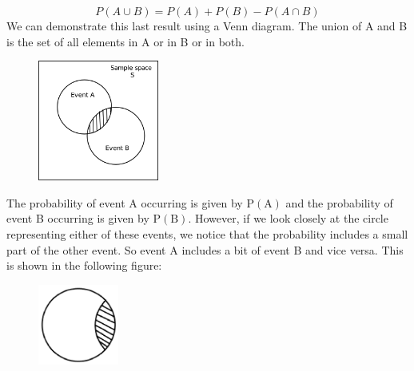     \begin{equation}
    P\left(A\cup B\right)=P\left(A\right)+P\left(B\right)-P\left(A\cap B\right)\tag{11.6}
      \end{equation}
\label{m39377*eip-41}We can demonstrate this last result using a Venn diagram. The union of A and B is the set of all elements in A or in B or in both.
    \setcounter{subfigure}{0}
	\begin{figure}[H] %
    \begin{center}
    \label{m39377*uid743!!!underscore!!!media}\label{m39377*uid743!!!underscore!!!printimage}\includegraphics[width=150px]{col11306.imgs/m39377_venn1.png} %
      \vspace{2pt}
    \vspace{.1in}
    \end{center}
 \end{figure}       
\par \label{m39377*eip-227}The probability of event A occurring is given by $\mathrm{P\left(A\right)}$ and the probability of event B occurring is given by $\mathrm{P\left(B\right)}$. However, if we look closely at the circle representing either of these events, we notice that the probability includes a small part of the other event. So event A includes a bit of event B and vice versa. This is shown in the following figure:
    \setcounter{subfigure}{0}
	\begin{figure}[H] %
    \begin{center}
    \label{m39377*id1112!!!underscore!!!media}\label{m39377*id1112!!!underscore!!!printimage}\includegraphics[width=100px]{col11306.imgs/m39377_identity1.png} %
      \vspace{2pt}
    \vspace{.1in}
    \end{center}
 \end{figure}       
